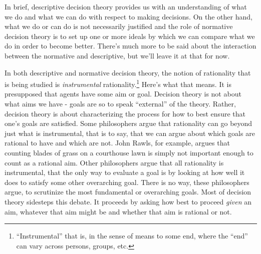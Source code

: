 \documentclass[]{tufte-book}
\begin{document}
In brief, descriptive decision theory provides us with an understanding of what we do and what we can do with respect to making decisions. On the other hand, what we do or can do is not necessarily justified and the role of normative decision theory is to set up one or more ideals by which we can compare what we do in order to become better. There's much more to be said about the interaction between the normative and descriptive, but we'll leave it at that for now.

In both descriptive and normative decision theory, the notion of rationality that is being studied is \emph{instrumental} rationality.\footnote{``Instrumental'' that is, in the sense of means to some end, where the ``end'' can vary across persons, groups, etc.} Here's what that means. It is presupposed that agents have some aim or goal. Decision theory is not about what aims we have - goals are so to speak ``external'' of the theory. Rather, decision theory is about characterizing the process for how to best ensure that one's goals are satisfied. Some philosophers argue that rationality can go beyond just what is instrumental, that is to say, that we can argue about which goals are rational to have and which are not. John Rawls, for example, argues that counting blades of grass on a courthouse lawn is simply not important enough to count as a rational aim. Other philosophers argue that all rationality is instrumental, that the only way to evaluate a goal is by looking at how well it does to satisfy some other overarching goal. There is no way, these philosophers argue, to scrutinize the most fundamental or overarching goals. Most of decision theory sidesteps this debate. It proceeds by asking how best to proceed \emph{given} an aim, whatever that aim might be and whether that aim is rational or not.
\end{document}
